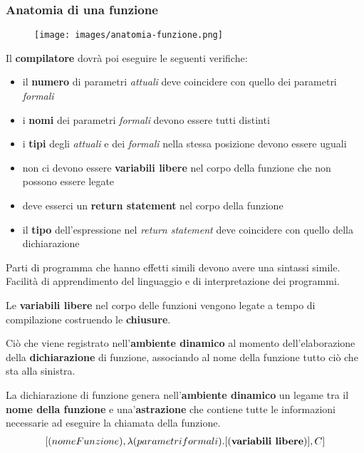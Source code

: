 \subsubsection{Anatomia di una funzione}
\begin{figure}[h!]
	\centering
	\texttt{[image: images/anatomia-funzione.png]}
	\caption{}
\end{figure}
Il \textbf{compilatore} dovrà poi eseguire le seguenti verifiche:
\begin{itemize}
	\item il \textbf{numero} di parametri \emph{attuali} deve coincidere con quello dei parametri \emph{formali}
	\item i \textbf{nomi} dei parametri \emph{formali} devono essere tutti distinti
	\item i \textbf{tipi} degli \emph{attuali} e dei \emph{formali} nella stessa posizione devono essere uguali
	\item non ci devono essere \textbf{variabili libere} nel corpo della funzione che non possono essere legate
	\item deve esserci un \textbf{return statement} nel corpo della funzione
	\item il \textbf{tipo} dell'espressione nel \emph{return statement} deve coincidere con quello della dichiarazione
\end{itemize}
\begin{definition}
	Parti di programma che hanno effetti simili devono avere una sintassi simile. Facilità di apprendimento del linguaggio e di interpretazione dei programmi.
\end{definition}
\begin{definition}
	Le \textbf{variabili libere} nel corpo delle funzioni vengono legate a tempo di compilazione costruendo le \textbf{chiusure}.
\end{definition}
\begin{definition}[Chiusura]
	Ciò che viene registrato nell'\textbf{ambiente dinamico} al momento  dell'elaborazione della \textbf{dichiarazione} di funzione, associando al nome della funzione tutto ciò che sta alla sinistra.
\end{definition}
La dichiarazione di funzione genera nell’\textbf{ambiente dinamico} un legame tra il \textbf{nome della funzione} e una'\textbf{astrazione} che contiene tutte le informazioni necessarie ad eseguire la chiamata della funzione.
\begin{align}
	\centering
	[(nomeFunzione), \lambda(parametri formali) . {[(\textbf{variabili libere})], C}]
\end{align}
